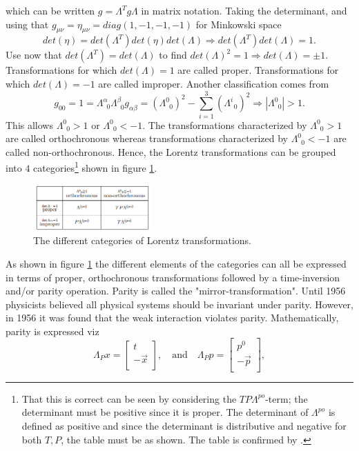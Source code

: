 which can be written $g=\Lambda^Tg\Lambda$ in matrix notation. Taking the determinant, and using that $g_{\mu\nu}=\eta_{\mu\nu}=diag(1,-1,-1,-1)$ for Minkowski space
\begin{equation}
	det(\eta)=det(\Lambda^T)det(\eta)det(\Lambda)\Rightarrow det(\Lambda^T)det(\Lambda)=1.
\end{equation} 
Use now that $det(\Lambda^T)=det(\Lambda)$ to find $det(\Lambda)^2=1\Rightarrow det(\Lambda)=\pm 1$. Transformations for which $det(\Lambda)= 1$ are called proper. Transformations for which $det(\Lambda)= -1$ are called improper. Another classification comes from
\begin{equation}
	g_{00}=1=\Lambda^\alpha_{\,\,\,0}\Lambda^\beta_{\,\,\,0}g_{\alpha\beta}=(\Lambda^0_{\,\,\,0})^2-\sum_{i=1}^{3}(\Lambda^i_{\,\,\,0})^2\Rightarrow |\Lambda^0_{\,\,\,0}|>1.
\end{equation} 
This allows $\Lambda^0_{\,\,\,0}>1$ or $\Lambda^0_{\,\,\,0}<-1$. The transformations characterized by $\Lambda^0_{\,\,\,0}>1$ are called orthochronous whereas transformations characterized by $\Lambda^0_{\,\,\,0}<-1$ are called non-orthochronous. Hence, the Lorentz transformations can be grouped into $4$ categories\footnote{That this is correct can be seen by considering the $TP\Lambda^{po}$-term; the determinant must be positive since it is proper. The determinant of $\Lambda^{po}$ is defined as positive and since the determinant is distributive and negative for both $T,P$, the table must be as shown. The table is confirmed by \citet{Srednicki2027}.} shown in figure \ref{fig:5}.
\begin{figure}[H]
	\captionsetup{width=1\textwidth}
	\centering
	\includegraphics[width=0.4\textwidth]{figures//5}
	\caption{The different categories of Lorentz transformations.}
	\label{fig:5}
\end{figure} 
As shown in figure \ref{fig:5} the different elements of the categories can all be expressed in terms of proper, orthochronous transformations followed by a time-inversion and/or parity operation. Parity is called the "mirror-transformation". Until 1956 physicists believed all physical systems should be invariant under parity. However, in 1956 it was found that the weak interaction violates parity. Mathematically, parity is expressed viz
\begin{equation}
	\Lambda_P x=\begin{bmatrix}
		t\\
		-\vec{x}\\
	\end{bmatrix}, \quad \text{and} \quad  \Lambda_Pp=\begin{bmatrix}
		p^0\\
		-\vec{p}\\
	\end{bmatrix},
\end{equation} 
